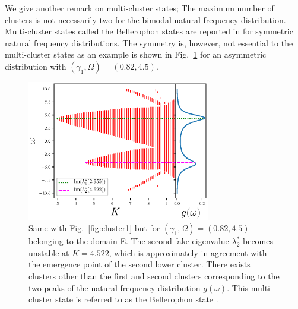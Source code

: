 
  We give another remark on multi-cluster states;
  The maximum number of clusters is not necessarily two
  for the bimodal natural frequency distribution.
  Multi-cluster states called the Bellerophon states
  are reported in \cite{bi2016,li2019}
  for symmetric natural frequency distributions.
  The symmetry is, however, not essential to the multi-cluster states
  as an example is shown in Fig.~\ref{fig:cluster5}
  for an asymmetric distribution with $(\gamma_{1},\Omega)=(0.82,4.5)$.


\begin{figure}[htbp]
\begin{center}
  \includegraphics[width=8cm]{figs/cluster5.eps}
\end{center}
  \caption{
    Same with Fig.~\ref{fig:cluster1} but for $(\gamma_{1},\Omega)=(0.82,4.5)$
    belonging to the domain E.
    The second fake eigenvalue $\lambda_{2}^{\ast}$
    becomes unstable at $K=4.522$,
    which is approximately in agreement with the emergence point of the second lower cluster.
    There exists clusters
    other than the first and second clusters corresponding
      to the two peaks of the natural frequency distribution $g(\omega)$.
    This multi-cluster state is referred to as the Bellerophon state \cite{bi2016,li2019}.}
  \label{fig:cluster5}
\end{figure}



